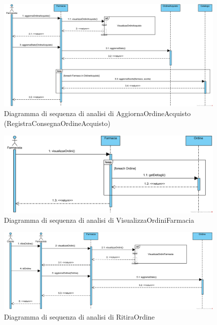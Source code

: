 \begin{figure}[!hbp]
	\centering
	\includegraphics[width=\linewidth]{assets/sequence_analisi/SequenceAnalisiAggiornaOrdineAcquisto.png}
	\caption{Diagramma di sequenza di analisi di AggiornaOrdineAcquisto (RegistraConsegnaOrdineAcquisto)}
\end{figure}

\begin{figure}[!hbp]
	\centering
	\includegraphics[width=0.8\linewidth]{assets/sequence_analisi/SequenceAnalisiVisualizzaOrdiniFarmacia.png}
	\caption{Diagramma di sequenza di analisi di VisualizzaOrdiniFarmacia}
\end{figure}

\begin{figure}[!hbp]
	\centering
	\includegraphics[width=0.8\linewidth]{assets/sequence_analisi/SequenceAnalisiRitiraOrdine.png}
	\caption{Diagramma di sequenza di analisi di RitiraOrdine}
\end{figure}

\pagebreak

